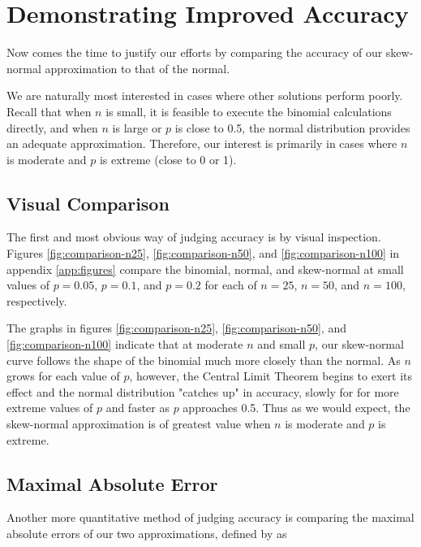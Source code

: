 \section{Demonstrating Improved Accuracy}
\label{sec:accuracy}

Now comes the time to justify our efforts by comparing the accuracy of our
skew-normal approximation to that of the normal.

We are naturally most interested in cases where other solutions perform poorly.
Recall that when $n$ is small, it is feasible to execute the binomial
calculations directly, and when $n$ is large or $p$ is close to 0.5, the normal
distribution provides an adequate approximation. Therefore, our interest is
primarily in cases where $n$ is moderate and $p$ is extreme (close to 0 or
1).\footnotemark


\subsection{Visual Comparison}

The first and most obvious way of judging accuracy is by visual inspection.
Figures \ref{fig:comparison-n25}, \ref{fig:comparison-n50}, and
\ref{fig:comparison-n100} in appendix \ref{app:figures} compare the binomial,
normal, and skew-normal at small values of $p=0.05$, $p=0.1$, and $p=0.2$ for
each of $n=25$, $n=50$, and $n=100$, respectively.

The graphs in figures \ref{fig:comparison-n25}, \ref{fig:comparison-n50}, and
\ref{fig:comparison-n100} indicate that at moderate $n$ and small $p$, our
skew-normal curve follows the shape of the binomial much more closely than the
normal. As $n$ grows for each value of $p$, however, the Central Limit Theorem
begins to exert its effect and the normal distribution "catches up" in
accuracy, slowly for for more extreme values of $p$ and faster as $p$
approaches 0.5. Thus as we would expect, the skew-normal approximation is of
greatest value when $n$ is moderate and $p$ is extreme.

\subsection{Maximal Absolute Error}
\label{subsec:mabs}

Another more quantitative method of judging accuracy is comparing the maximal
absolute errors of our two approximations, defined by \citet{mabs} as

